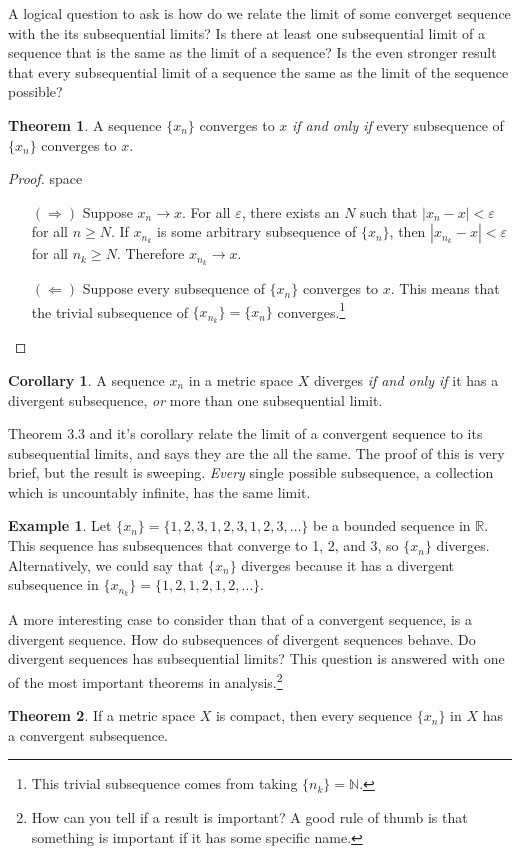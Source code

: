 \documentclass{article}
\newcommand{\N}{\mathbb{N}}
\newcommand{\R}{\mathbb{R}}
\theoremstyle{definition}
\newtheorem{theorem}{Theorem}[section]
\newtheorem{corollary}{Corollary}[section]
\newtheorem{example}{Example}[section]
\begin{document}
	A logical question to ask is how do we relate the limit of some converget sequence with the its subsequential limits? Is there at least one subsequential limit of a sequence that is the same as the limit of a sequence? Is the even stronger result that every subsequential limit of a sequence the same as the limit of the sequence possible? 
	\begin{theorem}
		A sequence $ \{x_n\} $ converges to $ x $ \textit{if and only if} every subsequence of $ \{x_n\} $ converges to $ x $.
	\end{theorem} 
	\begin{proof}{\color{white}space}
		\begin{enumerate}
			\item [$ (\Longrightarrow) $] Suppose $ x_n\to x $. For all $ \varepsilon $, there exists an $N $ such that $ |x_n-x|<\varepsilon $ for all $ n\ge N $. If $ x_{n_k} $ is some arbitrary subsequence of $ \{x_n\} $, then $ |x_{n_k}-x|<\varepsilon $ for all $ n_k\ge N $. Therefore $ x_{n_k}\to x $. 
			\item [$ (\Longleftarrow) $]  Suppose every subsequence of $ \{x_n\} $ converges to $ x $. This means that the trivial subsequence of $ \{x_{n_k}\}=\{x_n\} $ converges.\footnote{This trivial subsequence comes from taking $ \{n_k\}=\N $.} 
		\end{enumerate}
	\end{proof}
	\begin{corollary}
		A sequence $ x_n $ in a metric space $ X $ diverges \textit{if and only if} it has a divergent subsequence, \textit{or} more than one subsequential limit. 
	\end{corollary}
	Theorem 3.3 and it's corollary relate the limit of a convergent sequence to its subsequential limits, and says they are the all the same. The proof of this is very brief, but the result is sweeping. \textit{Every} single possible subsequence, a collection which is uncountably infinite, has the same limit.    
	\begin{example}
		Let $ \{x_n\}=\{1,2,3,1,2,3,1,2,3,\ldots\} $ be a bounded sequence in $ \R $. This sequence has subsequences that converge to 1, $2 $, and 3, so $ \{x_n\} $ diverges. Alternatively, we could say that $ \{x_n\} $ diverges because it has a divergent subsequence in $ \{x_{n_k}\}=\{1,2,1,2,1,2,\ldots\} $.  
	\end{example}
	A more interesting case to consider than that of a convergent sequence, is a divergent sequence. How do subsequences of divergent sequences behave. Do divergent sequences has subsequential limits? This question is answered with one of the most important theorems in analysis.\footnote{How can you tell if a result is important? A good rule of thumb is that something is important if it has some specific name.}
	\begin{theorem}
		If a metric space $X$ is compact, then every sequence $\{x_n\}$ in $X$ has a convergent subsequence.
	\end{theorem}
\end{document}
